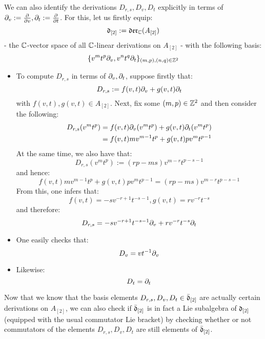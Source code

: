 \begin{remark}
                We can also identify the derivations $D_{r, s}, D_v, D_t$ explicitly in terms of $\partial_v := \frac{\partial}{\partial v}, \partial_t := \frac{\partial}{\partial t}$. For this, let us firstly equip:
                    $$\mathfrak{d}_{[2]} := \mathfrak{der}_{\mathbb{C}}(A_{[2]})$$
                - the $\mathbb{C}$-vector space of all $\mathbb{C}$-linear derivations on $A_{[2]}$ - with the following basis:
                    $$\{ v^m t^p \partial_v, v^n t^q \partial_t \}_{(m, p), (n, q) \in \mathbb{Z}^2}$$
                \begin{itemize}
                    \item To compute $D_{r, s}$ in terms of $\partial_v, \partial_t$, suppose firstly that:
                        $$D_{r, s} := f(v, t) \partial_v + g(v, t) \partial_t$$
                    with $f(v, t), g(v, t) \in A_{[2]}$. Next, fix some $(m, p) \in \mathbb{Z}^2$ and then consider the following:
                        $$
                            \begin{aligned}
                                D_{r, s}( v^m t^p ) & = f(v, t) \partial_v( v^m t^p ) + g(v, t) \partial_t( v^m t^p )
                                \\
                                & = f(v, t) m v^{m - 1} t^p + g(v, t) p v^m t^{p - 1}
                            \end{aligned}
                        $$
                    At the same time, we also have that:
                        $$D_{r, s}(v^m t^p) := ( rp - ms ) v^{m - r} t^{p - s - 1}$$
                    and hence:
                        $$f(v, t) m v^{m - 1} t^p + g(v, t) p v^m t^{p - 1} = ( rp - ms ) v^{m - r} t^{p - s - 1}$$
                    From this, one infers that:
                        $$f(v, t) = -s v^{-r + 1} t^{-s - 1}, g(v, t) = r v^{-r} t^{-s}$$
                    and therefore:
                        $$D_{r, s} = -s v^{-r + 1} t^{-s - 1} \partial_v + r v^{-r} t^{-s} \partial_t$$
                    \item One easily checks that:
                        $$D_v = v t^{-1} \partial_v$$
                    \item Likewise:
                        $$D_t = \partial_t$$
                \end{itemize}

                Now that we know that the basis elements $D_{r, s}, D_v, D_t \in \bar{\mathfrak{d}}_{[2]}$ are actually certain derivations on $A_{[2]}$, we can also check if $\bar{\mathfrak{d}}_{[2]}$ is in fact a Lie subalgebra of $\mathfrak{d}_{[2]}$ (equipped with the usual commutator Lie bracket) by checking whether or not commutators of the elements $D_{r, s}, D_v, D_t$ are still elements of $\bar{\mathfrak{d}}_{[2]}$.
            \end{remark}
            
